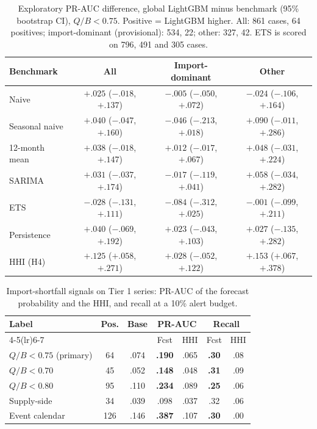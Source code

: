 \documentclass[conference]{IEEEtran}
\begin{document}
\begin{table}[t]
\centering
\caption{Exploratory PR-AUC difference, global LightGBM minus benchmark (95\% bootstrap CI), $Q/B<0.75$. Positive = LightGBM higher. All: 861 cases, 64 positives; import-dominant (provisional): 534, 22; other: 327, 42. ETS is scored on 796, 491 and 305 cases.}
\label{tab:h4bench}
\scriptsize
\setlength{\tabcolsep}{2pt}
\begin{tabular}{@{}lccc@{}}
\toprule
Benchmark & All & Import-dominant & Other\\
\midrule
Naive & $+.025$ ($-.018$, $+.137$) & $-.005$ ($-.050$, $+.072$) & $-.024$ ($-.106$, $+.164$)\\
Seasonal naive & $+.040$ ($-.047$, $+.160$) & $-.046$ ($-.213$, $+.018$) & $+.090$ ($-.011$, $+.286$)\\
12-month mean & $+.038$ ($-.018$, $+.147$) & $+.012$ ($-.017$, $+.067$) & $+.048$ ($-.031$, $+.224$)\\
SARIMA & $+.031$ ($-.037$, $+.174$) & $-.017$ ($-.119$, $+.041$) & $+.058$ ($-.034$, $+.282$)\\
ETS & $-.028$ ($-.131$, $+.111$) & $-.084$ ($-.312$, $+.025$) & $-.001$ ($-.099$, $+.211$)\\
Persistence & $+.040$ ($-.069$, $+.192$) & $+.023$ ($-.043$, $+.103$) & $+.027$ ($-.135$, $+.282$)\\
HHI (H4) & $+.125$ ($+.058$, $+.271$) & $+.028$ ($-.052$, $+.122$) & $+.153$ ($+.067$, $+.378$)\\
\bottomrule
\end{tabular}
\end{table}

\begin{table}[t]
\centering
\caption{Import-shortfall signals on Tier 1 series: PR-AUC of the forecast probability and the HHI, and recall at a 10\% alert budget.}
\label{tab:h4}
\small
\setlength{\tabcolsep}{3pt}
\begin{tabular}{@{}lcccccc@{}}
\toprule
Label & Pos. & Base & \multicolumn{2}{c}{PR-AUC} & \multicolumn{2}{c}{Recall}\\
\cmidrule(lr){4-5}\cmidrule(lr){6-7}
 & & & Fcst & HHI & Fcst & HHI\\
\midrule
$Q/B<0.75$ (primary) & 64 & .074 & \textbf{.190} & .065 & \textbf{.30} & .08\\
$Q/B<0.70$ & 45 & .052 & \textbf{.148} & .048 & \textbf{.31} & .09\\
$Q/B<0.80$ & 95 & .110 & \textbf{.234} & .089 & \textbf{.25} & .06\\
Supply-side & 34 & .039 & .098 & .037 & .32 & .06\\
Event calendar & 126 & .146 & \textbf{.387} & .107 & \textbf{.30} & .00\\
\bottomrule
\end{tabular}
\end{table}
\end{document}

